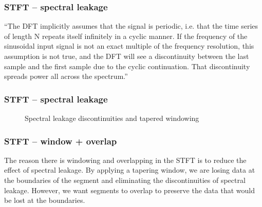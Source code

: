 \documentclass{beamer}
\begin{document}
\begin{frame}
	\frametitle{STFT -- spectral leakage}
	``The DFT implicitly assumes that the signal is periodic, i.e. that the time series of length N repeats itself infinitely in a cyclic manner. If the frequency of the sinusoidal input signal is not an exact multiple of the frequency resolution, this assumption is not true, and the DFT will see a discontinuity between the last sample and the first sample due to the cyclic continuation. That discontinuity spreads power all across the spectrum.'' 
\end{frame}

\begin{frame}
	\frametitle{STFT -- spectral leakage}
	\begin{figure}
		\hspace{0.2em}
		\caption{Spectral leakage discontinuities and tapered windowing}
	\end{figure}
\end{frame}

\begin{frame}
	\frametitle{STFT -- window + overlap}
The reason there is windowing and overlapping in the STFT is to reduce the effect of spectral leakage. By applying a tapering window, we are losing data at the boundaries of the segment and eliminating the discontinuities of spectral leakage. However, we want segments to overlap to preserve the data that would be lost at the boundaries.
\end{frame}
\end{document}
